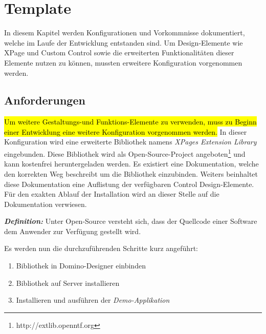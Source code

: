 \chapter{Template}

In diesem Kapitel werden Konfigurationen und Vorkommnisse dokumentiert, welche im Laufe der Entwicklung entstanden sind.
Um Design-Elemente wie XPage und Custom Control sowie die erweiterten Funktionalitäten dieser Elemente nutzen zu können, mussten
erweitere Konfiguration vorgenommen werden. 

\section{Anforderungen}
\label{sec:6template}
\hl{Um weitere Gestaltungs-und Funktions-Elemente zu verwenden, muss zu Beginn einer Entwicklung eine weitere Konfiguration vorgenommen werden.}
In dieser Konfiguration wird eine erweiterte Bibliothek namens \textit{XPages Extension Library} eingebunden.
Diese Bibliothek wird als Open-Source-Project angeboten\footnote{http://extlib.openntf.org} und kann kostenfrei heruntergeladen werden.
Es existiert eine Dokumentation, welche den korrekten Weg beschreibt um die Bibliothek einzubinden. Weiters beinhaltet diese Dokumentation eine Auflistung
der verfügbaren Control Design-Elemente. %
Für den exakten Ablauf der Installation wird an dieser Stelle auf die Dokumentation verwiesen.
\vspace{0.5cm}

\begin{graybox}
\textbf{\textit{Definition:}} Unter Open-Source versteht sich, dass der Quellcode einer Software dem Anwender zur Verfügung gestellt wird.
\end{graybox}

\vspace{0.3cm}

\begin{flushleft}
Es werden nun die durchzuführenden Schritte kurz angeführt:
\end{flushleft}
\begin{enumerate}
\item Bibliothek in Domino-Designer einbinden 
\item Bibliothek auf Server installieren
\item Installieren und ausführen der \textit{Demo-Applikation}
\end{enumerate}

